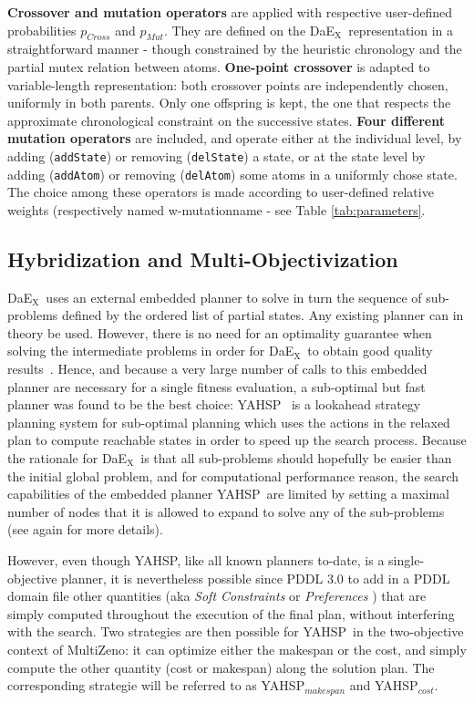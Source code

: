 \documentclass{llncs}
\def\DAEX{{\sc DaE$_{\text{X}}$}}
\def\YAHSP{{\sc YAHSP}}
\def\MULTIZENO{{\sc MultiZeno}}
\renewcommand{\paragraph}[1]{{\bf #1}}
\begin{document}
\paragraph{Crossover and mutation operators} are applied with respective user-defined probabilities $p_{Cross}$ and $p_{Mut}$. They are defined on the \DAEX\ representation in a straightforward manner - though constrained by the heuristic chronology and the partial mutex relation between atoms.
{\bf One-point crossover} is adapted to variable-length representation: both crossover points are independently chosen, uniformly in both parents. Only one offspring is kept, the one that respects the approximate chronological constraint on the successive states. 
{\bf Four different mutation operators} are included, and operate either at the individual level, by adding ({\tt addState}) or removing ({\tt delState}) a state, or at the state level by adding ({\tt addAtom}) or removing ({\tt delAtom}) some atoms in a uniformly chose state. The choice among these operators is made according to user-defined relative weights (respectively named w-mutationname - see Table \ref{tab:parameters}. 


\subsection{Hybridization and Multi-Objectivization}
\label{sec:multiobjectivization}
\DAEX\ uses an external embedded planner to solve in turn the sequence of sub-problems defined by the ordered list of partial states.
Any existing planner can in theory be used. However, there is no need for an optimality guarantee when solving the intermediate problems in order for \DAEX\ to obtain good quality results~\cite{Bibai2010}. Hence, and because a very large number of calls to this embedded planner are necessary for a single fitness evaluation, a sub-optimal but fast planner was found to be the best choice: \YAHSP~\cite{Vidal2004} is a lookahead 
strategy planning system for sub-optimal planning which uses the  actions in the relaxed plan to compute reachable states in order to speed up the search process.
Because the rationale for \DAEX\ is that all sub-problems should hopefully be easier than the initial global problem, and for computational performance reason, the search capabilities of the embedded planner \YAHSP\ are limited by setting a maximal number of nodes that it is allowed to expand to solve any of the sub-problems (see again \cite{Bibai2010} for more details).
 
However, even though \YAHSP, like all known planners to-date, is a single-objective planner, it is nevertheless possible since PDDL 3.0 to add in a PDDL domain file other quantities (aka {\em Soft Constraints} or {\em Preferences} \cite{gerevini2006preferences}) that are simply computed throughout the execution of the final plan, without interfering with the search. Two strategies are then possible for \YAHSP\ in the two-objective context of \MULTIZENO: it can optimize either the makespan or the cost, and simply compute the other quantity (cost or makespan) along the solution plan. The corresponding strategie will be referred to as \YAHSP$_{makespan}$ and \YAHSP$_{cost}$. 
\end{document}
